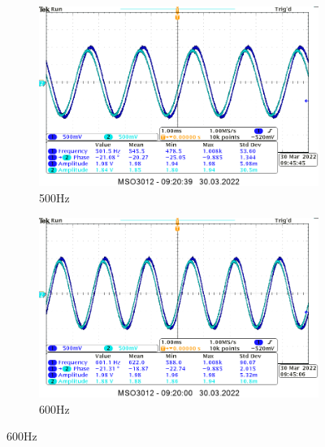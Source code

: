 \begin{itemize}
{    \begin{figure}[H]
        \centering
        \begin{subfigure}[h]{0.4\textwidth}
            \includegraphics[width=\textwidth]{img_osciloscope/CR/CR_500Hz_cropped.png}
            \caption*{500Hz}
        \end{subfigure}
        \begin{subfigure}[h]{0.4\textwidth}
            \includegraphics[width=\textwidth]{img_osciloscope/CR/CR_600Hz_cropped.png}
            \caption*{600Hz}
        \end{subfigure}
    \end{figure}
    
}
\end{itemize}
